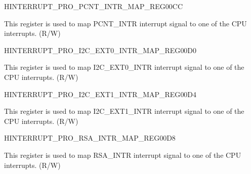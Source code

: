 \begin{register}{H}{INTERRUPT\_PRO\_PCNT\_INTR\_MAP\_REG}{\hexprefix{}00CC}\label{regdesc:INTERRUPTPROPCNTINTRMAPREG}
%
%
\regnewline%
\begin{regdesc}\begin{reglist}
\label{fielddesc:INTERRUPTPROPCNTINTRMAP}\item [INTERRUPT\_PRO\_PCNT\_INTR\_MAP] This register is used to map PCNT\_INTR interrupt signal to one of the CPU interrupts. (R/W)
\end{reglist}\end{regdesc}
\end{register}


\begin{register}{H}{INTERRUPT\_PRO\_I2C\_EXT0\_INTR\_MAP\_REG}{\hexprefix{}00D0}\label{regdesc:INTERRUPTPROI2CEXT0INTRMAPREG}
%
%
\regnewline%
\begin{regdesc}\begin{reglist}
\label{fielddesc:INTERRUPTPROI2CEXT0INTRMAP}\item [INTERRUPT\_PRO\_I2C\_EXT0\_INTR\_MAP] This register is used to map I2C\_EXT0\_INTR interrupt signal to one of the CPU interrupts. (R/W)
\end{reglist}\end{regdesc}
\end{register}


\begin{register}{H}{INTERRUPT\_PRO\_I2C\_EXT1\_INTR\_MAP\_REG}{\hexprefix{}00D4}\label{regdesc:INTERRUPTPROI2CEXT1INTRMAPREG}
%
%
\regnewline%
\begin{regdesc}\begin{reglist}
\label{fielddesc:INTERRUPTPROI2CEXT1INTRMAP}\item [INTERRUPT\_PRO\_I2C\_EXT1\_INTR\_MAP] This register is used to map I2C\_EXT1\_INTR interrupt signal to one of the CPU interrupts. (R/W)
\end{reglist}\end{regdesc}
\end{register}


\begin{register}{H}{INTERRUPT\_PRO\_RSA\_INTR\_MAP\_REG}{\hexprefix{}00D8}\label{regdesc:INTERRUPTPRORSAINTRMAPREG}
%
%
\regnewline%
\begin{regdesc}\begin{reglist}
\label{fielddesc:INTERRUPTPRORSAINTRMAP}\item [INTERRUPT\_PRO\_RSA\_INTR\_MAP] This register is used to map RSA\_INTR interrupt signal to one of the CPU interrupts. (R/W)
\end{reglist}\end{regdesc}
\end{register}


